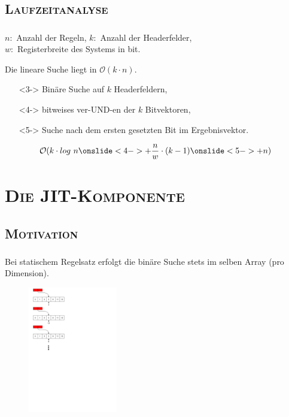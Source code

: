 \documentclass[xcolor=x11names,compress]{beamer}
\renewcommand{\(}{\begin{columns}}
\renewcommand{\)}{\end{columns}}
\newcommand{\<}[1]{\begin{column}{#1}}
\renewcommand{\>}{\end{column}}
\begin{document}
\subsection{\scshape Laufzeitanalyse}
\begin{frame}
  \frametitle{\insertsubsection}
  $n:$ Anzahl der Regeln, $k:$ Anzahl der Headerfelder,\\$w:$ Registerbreite des Systems in bit.
  \pause
  \begin{tcolorbox}[colback=red!5!white,colframe=red!75!black,title=Erinnerung: Lineare Suche,drop fuzzy shadow]
  Die lineare Suche liegt in $\mathcal O(k \cdot n)$.
  \end{tcolorbox}
  \pause
  \begin{tcolorbox}[colback=teal!5!white,colframe=teal!75!black,title=Bitvector-Algorithmus,drop fuzzy shadow]
  \begin{itemize}[leftmargin=0cm]
    \item[]<3-> Binäre Suche auf $k$ Headerfeldern,
    \item[]<4-> bitweises ver-UND-en der $k$ Bitvektoren,
    \item[]<5-> Suche nach dem ersten gesetzten Bit im Ergebnisvektor.
  \end{itemize}
  \centering
  \begin{equation*}
  \mathcal O(k \cdot log\ n \onslide<4->{+ \frac{n}{w} \cdot (k - 1)} \onslide<5->{ + n})
  \end{equation*}
  \end{tcolorbox}
\end{frame}

\section{\scshape Die JIT-Komponente}
\begin{frame}
  \centering\Huge{\insertsection}
\end{frame}

\subsection{\scshape Motivation}
\begin{frame}
  \frametitle{\insertsubsection}
  Bei statischem Regelsatz erfolgt die binäre Suche stets im selben Array (pro Dimension).\\
  \begin{figure}
  \centering
  \includegraphics[height=5.5cm]{figures/matching_process}
  \end{figure}
\end{frame}
\end{document}
